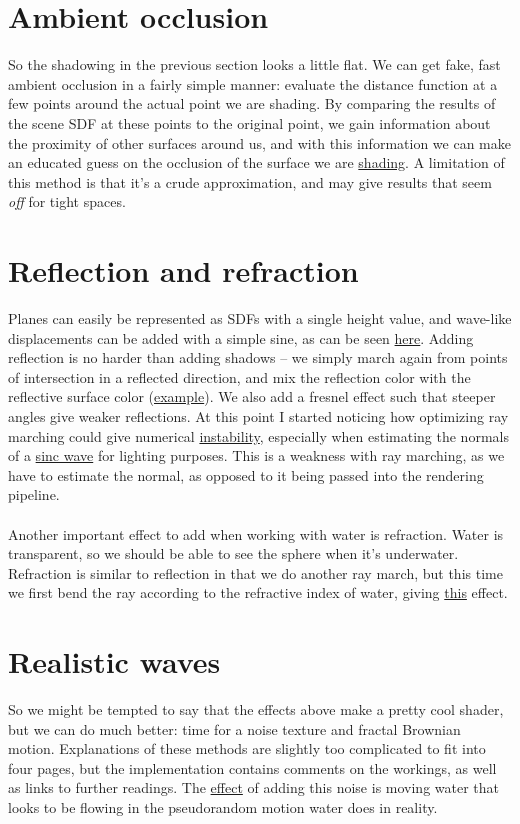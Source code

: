 \documentclass[abstract=off,oneside]{scrreprt}
\begin{document}
\section*{Ambient occlusion}
\label{sec-7}
\label{sec:ao}
So the shadowing in the previous section looks a little flat. We can
get fake, fast ambient occlusion in a fairly simple manner: evaluate
the distance function at a few points around the actual point we are
shading. By comparing the results of the scene SDF at these points to
the original point, we gain information about the proximity of other
surfaces around us, and with this information we can make an educated
guess on the occlusion of the surface we are \hyperref[fig:ao]{shading}. A limitation of
this method is that it's a crude approximation, and may give results
that seem \emph{off} for tight spaces.

\section*{Reflection and refraction}
\label{sec-8}
\label{sec:water}
Planes can easily be represented as SDFs with a single height value,
and wave-like displacements can be added with a simple sine, as can be
seen \hyperref[fig:simplewater]{here}. Adding reflection is no harder than adding shadows -- we
simply march again from points of intersection in a reflected
direction, and mix the reflection color with the reflective surface
color (\hyperref[fig:reflection]{example}). We also add a fresnel effect such that steeper angles
give weaker reflections. At this point I started noticing how
optimizing ray marching could give numerical \hyperref[fig:instability]{instability}, especially
when estimating the normals of a \hyperref[fig:instability2]{sinc wave} for lighting purposes. This
is a weakness with ray marching, as we have to estimate the normal, as
opposed to it being passed into the rendering pipeline.
\\\\
Another important effect to add when working with water is
refraction. Water is transparent, so we should be able to see the
sphere when it's underwater. Refraction is similar to reflection in
that we do another ray march, but this time we first bend the ray
according to the refractive index of water, giving \hyperref[fig:refraction]{this} effect.

\section*{Realistic waves}
\label{sec-9}
\label{sec:realisticwaves}
So we might be tempted to say that the effects above make a pretty
cool shader, but we can do much better: time for a noise texture and
fractal Brownian motion. Explanations of these methods are slightly
too complicated to fit into four pages, but the implementation
contains comments on the workings, as well as links to further
readings. The \hyperref[fig:noise]{effect} of adding this noise is moving water that
looks to be flowing in the pseudorandom motion water does in reality.
\end{document}
